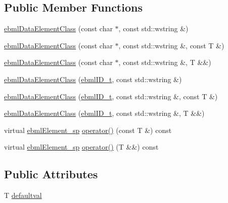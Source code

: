 \subsection*{Public Member Functions}
\begin{DoxyCompactItemize}
\item 
\mbox{\hyperlink{classebml_1_1ebmlDataElementClass_a9fc67c00537acbd8c4e67c62d4e8a877}{ebml\+Data\+Element\+Class}} (const char $\ast$, const std\+::wstring \&)
\item 
\mbox{\hyperlink{classebml_1_1ebmlDataElementClass_a9041c4768574aa8a05008622c59d1505}{ebml\+Data\+Element\+Class}} (const char $\ast$, const std\+::wstring \&, const T \&)
\item 
\mbox{\hyperlink{classebml_1_1ebmlDataElementClass_a563cc43ab0bffe8be47cd3c675ce675e}{ebml\+Data\+Element\+Class}} (const char $\ast$, const std\+::wstring \&, T \&\&)
\item 
\mbox{\hyperlink{classebml_1_1ebmlDataElementClass_a96c16b441ed04a1c34ff2f52d6a86655}{ebml\+Data\+Element\+Class}} (\mbox{\hyperlink{namespaceebml_a86c5f604ddf12a74aa9812e997a58691}{ebml\+I\+D\+\_\+t}}, const std\+::wstring \&)
\item 
\mbox{\hyperlink{classebml_1_1ebmlDataElementClass_a7b0726f332f9abadac8b7b4672cf1013}{ebml\+Data\+Element\+Class}} (\mbox{\hyperlink{namespaceebml_a86c5f604ddf12a74aa9812e997a58691}{ebml\+I\+D\+\_\+t}}, const std\+::wstring \&, const T \&)
\item 
\mbox{\hyperlink{classebml_1_1ebmlDataElementClass_a3af7912dc41d400db7b1347766fef924}{ebml\+Data\+Element\+Class}} (\mbox{\hyperlink{namespaceebml_a86c5f604ddf12a74aa9812e997a58691}{ebml\+I\+D\+\_\+t}}, const std\+::wstring \&, T \&\&)
\item 
virtual \mbox{\hyperlink{namespaceebml_adad533b7705a16bb360fe56380c5e7be}{ebml\+Element\+\_\+sp}} \mbox{\hyperlink{classebml_1_1ebmlDataElementClass_af50d05f41174fbac6efa1a8cbdc5b4fe}{operator()}} (const T \&) const
\item 
virtual \mbox{\hyperlink{namespaceebml_adad533b7705a16bb360fe56380c5e7be}{ebml\+Element\+\_\+sp}} \mbox{\hyperlink{classebml_1_1ebmlDataElementClass_a4e5efa44d8b7440b16bb3df7754c4544}{operator()}} (T \&\&) const
\end{DoxyCompactItemize}
\subsection*{Public Attributes}
\begin{DoxyCompactItemize}
\item 
T \mbox{\hyperlink{classebml_1_1ebmlDataElementClass_a5ad1fcb2708f62d3d80eab6d9ad112be}{defaultval}}
\end{DoxyCompactItemize}
